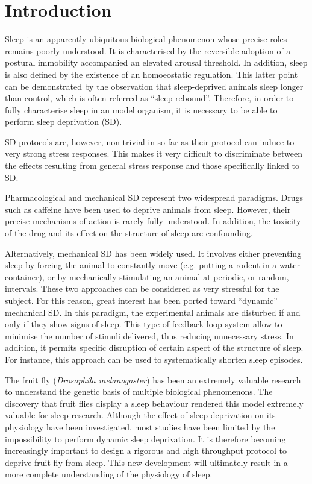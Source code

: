 \section{Introduction}

Sleep is an apparently ubiquitous biological phenomenon whose precise roles remains poorly understood.
It is characterised by the reversible adoption of a postural immobility accompanied an elevated arousal threshold. 
In addition, sleep is also defined by the existence of an homoeostatic regulation.
This latter point can be demonstrated by the observation that sleep-deprived animals sleep longer than control, which is often referred as ``sleep rebound''.
Therefore, in order to fully characterise sleep in an model organism, it is necessary to be able to perform sleep deprivation (SD).

SD protocols are, however, non trivial in so far as their protocol can induce to very strong stress responses.
This makes it very difficult to discriminate between the effects resulting from general stress response and those specifically linked to SD.

Pharmacological and mechanical SD represent two widespread paradigms.
Drugs such as caffeine have been used to deprive animals from sleep. 
However, their precise mechanisms of action is rarely fully understood.
In addition, the toxicity of the drug and its effect on the structure of sleep are confounding.

Alternatively, mechanical SD has been widely used. It involves either preventing  sleep by forcing the animal to constantly move (e.g. putting a rodent in a water container), or by mechanically stimulating an animal at periodic, or random, intervals. These two approaches can be considered as very stressful for the subject.
For this reason, great interest has been ported toward ``dynamic'' mechanical SD.
In this paradigm, the experimental animals are disturbed if and only if they show signs of sleep.
This type of feedback loop system allow to minimise the number of stimuli delivered, thus reducing unnecessary stress.
In addition, it permits specific disruption of certain aspect of the structure of sleep. 
For instance, this approach can be used to systematically shorten sleep episodes.

The fruit fly (\emph{Drosophila melanogaster}) has been an extremely valuable research to understand the genetic basis of multiple biological phenomenons.
The discovery that fruit flies display a sleep behaviour rendered this model extremely valuable for sleep research.
Although the effect of sleep deprivation on its physiology have been investigated, most studies have been limited by the impossibility to perform dynamic sleep deprivation.
It is therefore becoming increasingly important to design a rigorous and high throughput protocol to deprive fruit fly from sleep. This new development will ultimately result in a more complete understanding of the physiology of sleep.

